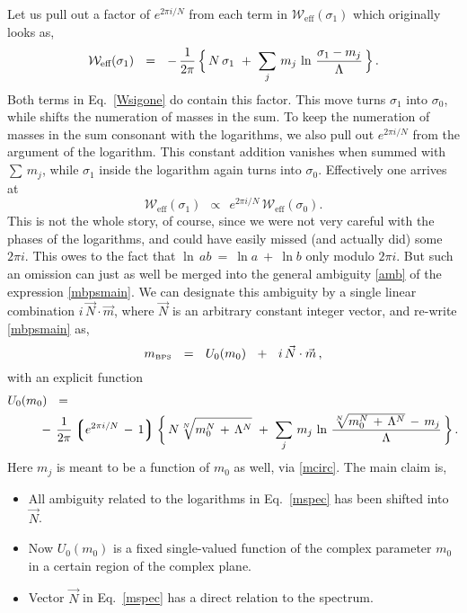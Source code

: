 \documentclass[epsfig,12pt]{article}
\def\beq{\begin{equation}}
\def\eeq{\end{equation}}
\def\beq{\begin{equation}}
\def\eeq{\end{equation}}
\newcommand{\lgr}{\left\lgroup}
\newcommand{\rgr}{\right\rgroup}
\newcommand{\mbps}{m_{\text{\tiny BPS}}}
\newcommand{\W}{\mathcal{W}}
\begin{document}
	Let us pull out a factor of $ e^{2\pi i / N} $ from each term in 
	$ \W_\text{eff} ( \sigma_1 ) $ which originally looks as,
\beq
\label{Wsigone}
	\W_\text{eff} ( \sigma_1 ) ~~=~~ 
		-\, \frac{1}{2\pi}\,  
                \Bigl\{\, N\, \sigma_1 ~+~ \sum_j\, m_j\, \ln \,\frac{\sigma_1 - m_j}{\Lambda} \,\Bigr\}\,.
\eeq
	Both terms in Eq.~\eqref{Wsigone} do contain this factor.
	This move turns $ \sigma_1 $ into $ \sigma_0 $, while shifts the numeration of masses in the sum.
	To keep the numeration of masses in the sum consonant with the logarithms, we also pull out
	$ e^{2\pi i / N} $ from the argument of the logarithm.
	This constant addition vanishes when summed with $ \sum\, m_j $,
	while $ \sigma_1 $ inside the logarithm again turns into $ \sigma_0 $.
	Effectively one arrives at 
\beq
	\W_\text{eff}(\sigma_1) ~~\propto~~ e^{2\pi i / N}\, \W_\text{eff}(\sigma_0).
\eeq
	This is not the whole story, of course, since we were not very careful with the phases
	of the logarithms, and could have easily missed (and actually did) some $ 2 \pi i $.
	This owes to the fact that $ \ln\,a b ~=~ \ln a ~+~ \ln b $ only modulo $ 2\pi i $.
	But such an omission can just as well be merged into the general ambiguity \eqref{amb}
	of the expression \eqref{mbpsmain}.
	We can designate this ambiguity by a single linear combination $ i\, \vec{N} \cdot \vec{m} $, where $ \vec{N} $
	is an arbitrary constant integer vector, and re-write \eqref{mbpsmain} as,
\beq
\label{mspec}
	\mbps ~~=~~ U_0 (m_0) ~~+~~ i\, \vec{N} \cdot \vec{m}\,,
\eeq
	with an explicit function
\begin{align}
%
\label{unod}
	U_0 (m_0) & ~~=~~ 
	\\
%
\notag
	&\!\!\!\! -\, \frac{1}{2\pi} \lgr e^{2\pi i / N} \,-\, 1 \rgr 
	\biggl\{\, N \sqrt[N] { m_0^N \,+\, \Lambda^N }  ~+~
		\sum_j\, m_j\, \ln \, \frac{ \sqrt[N] { m_0^N \,+\, \Lambda^N } \,-\, m_j } { \Lambda} \,\biggr\}\,.
\end{align}
	Here $ m_j $ is meant to be a function of $ m_0 $ as well, via \eqref{mcirc}. 
	The main claim is,
\begin{itemize}
\item
	All ambiguity related to the logarithms in Eq.~\eqref{mspec} has been shifted into $ \vec{N} $. 
\item
	Now $ U_0(m_0) $ is a fixed single-valued function of the complex parameter $ m_0 $
	in a certain region of the complex plane.

\item
	Vector $ \vec{N} $ in Eq.~\eqref{mspec} has a direct relation to the spectrum.
\end{itemize}
\end{document}
